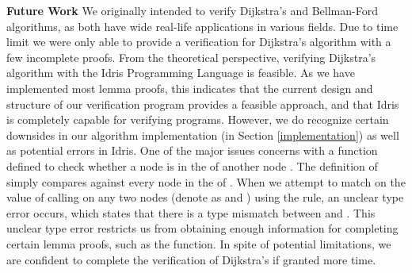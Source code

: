 \textbf{Future Work} We originally intended to verify Dijkstra's and Bellman-Ford algorithms, as both have wide real-life applications in various fields. Due to time limit we were only able to provide a verification for Dijkstra's algorithm with a few incomplete proofs. From the theoretical perspective, verifying Dijkstra's algorithm with the Idris Programming Language is feasible. As we have implemented most lemma proofs, this indicates that the current design and structure of our verification program provides a feasible approach, and that Idris is completely capable for verifying programs. However, we do recognize certain downsides in our algorithm implementation (in Section \ref{implementation}) as well as potential errors in Idris. One of the major issues concerns with a  function defined to check whether a node  is in the  of another node . The definition of  simply compares  against every node in the  of . When we attempt to match on the value of calling  on any two nodes (denote as  and ) using the  rule, an unclear type error occurs, which states that there is a type mismatch between  and . This unclear type error restricts us from obtaining enough information for completing certain lemma proofs, such as the  function. In spite of potential limitations, we are confident to complete the verification of Dijkstra's if granted more time. 


